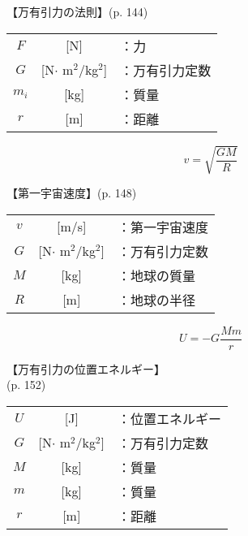 \documentclass[10pt]{jarticle}
\begin{document}
\vskip3mm
【万有引力の法則】{\footnotesize (p. 144)}

\begin{tabular}{ccl}
$F$	&[N]	&：力 \\
$G$	&{\small [N$\cdot \!\!$ m$^2 \!$/kg$^2$]}	&：万有引力定数 \\
$m_i$	&[kg]	&：質量 \\
$r$	&[m]	&：距離
\end{tabular}





\newpage
\[
v = \sqrt{\frac{G M}{R}}
\]


\vskip3mm
【第一宇宙速度】{\footnotesize (p. 148)}

\begin{tabular}{ccl}
$v$	&[m/s]	&：第一宇宙速度 \\
$G$	&{\small [N$\cdot \!\!$ m$^2 \!$/kg$^2$]}	&：万有引力定数 \\
$M$	&[kg]	&：地球の質量 \\
$R$	&[m]	&：地球の半径
\end{tabular}





\newpage
\[
U = - G \frac{M m}{r}
\]


\vskip3mm
【万有引力の位置エネルギー】\\
\hfill {\footnotesize (p. 152)}

\begin{tabular}{ccl}
$U$	&[J]	&：{\small 位置エネルギー} \\
$G$	&{\small [N$\cdot \!\!$ m$^2\!$/kg$^2$]}	&：万有引力定数 \\
$M$	&[kg]	&：質量 \\
$m$	&[kg]	&：質量 \\
$r$	&[m]	&：距離
\end{tabular}
\end{document}
